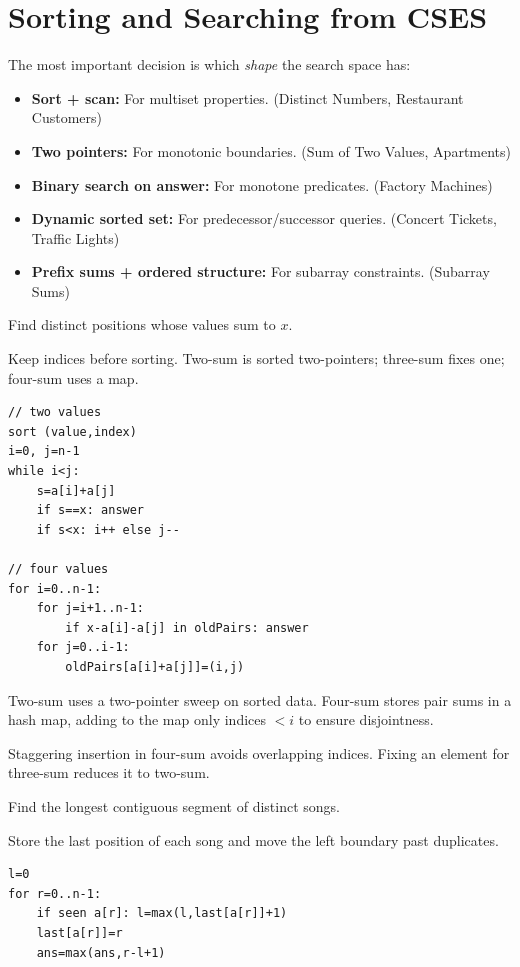 \section{Sorting and Searching from CSES}

The most important decision is which \emph{shape} the search space has:
\begin{itemize}
	\item \textbf{Sort + scan:} For multiset properties. (Distinct Numbers, Restaurant Customers)
	\item \textbf{Two pointers:} For monotonic boundaries. (Sum of Two Values, Apartments)
	\item \textbf{Binary search on answer:} For monotone predicates. (Factory Machines)
	\item \textbf{Dynamic sorted set:} For predecessor/successor queries. (Concert Tickets, Traffic Lights)
	\item \textbf{Prefix sums + ordered structure:} For subarray constraints. (Subarray Sums)
\end{itemize}


\Problem Find distinct positions whose values sum to $x$.

Keep indices before sorting. Two-sum is sorted two-pointers; three-sum fixes one; four-sum uses a map.
\begin{lstlisting}
// two values
sort (value,index)
i=0, j=n-1
while i<j:
    s=a[i]+a[j]
    if s==x: answer
    if s<x: i++ else j--

// four values
for i=0..n-1:
    for j=i+1..n-1:
        if x-a[i]-a[j] in oldPairs: answer
    for j=0..i-1:
        oldPairs[a[i]+a[j]]=(i,j)
\end{lstlisting}

\Solution Two-sum uses a two-pointer sweep on sorted data. Four-sum stores pair sums in a hash map, adding to the map only indices $<i$ to ensure disjointness.

\Analysis Staggering insertion in four-sum avoids overlapping indices. Fixing an element for three-sum reduces it to two-sum.


\Problem Find the longest contiguous segment of distinct songs.

Store the last position of each song and move the left boundary past duplicates.
\begin{lstlisting}
l=0
for r=0..n-1:
    if seen a[r]: l=max(l,last[a[r]]+1)
    last[a[r]]=r
    ans=max(ans,r-l+1)
\end{lstlisting}

